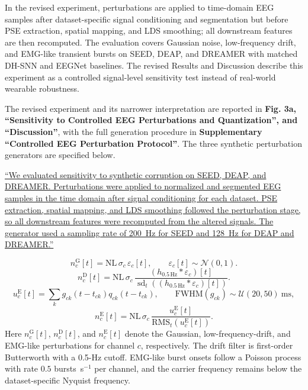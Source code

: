 \documentclass[12pt,technote,onecolumn]{IEEEtran}
\begin{document}
In the revised experiment, perturbations are applied to time-domain EEG
samples after dataset-specific signal conditioning and segmentation but
before PSE extraction, spatial mapping, and LDS smoothing; all
downstream features are then recomputed. The evaluation covers Gaussian
noise, low-frequency drift, and EMG-like transient bursts on SEED, DEAP,
and DREAMER with matched DH-SNN and EEGNet baselines. The revised
Results and Discussion describe this experiment as a controlled
signal-level sensitivity test instead of real-world wearable robustness.



The revised experiment and its narrower interpretation are reported in \textbf{Fig. 3a, ``Sensitivity to Controlled EEG Perturbations and Quantization'', and ``Discussion''}, with the full generation procedure in \textbf{Supplementary ``Controlled EEG Perturbation Protocol''}. The three synthetic perturbation generators are specified below.

\uline{``We evaluated sensitivity to synthetic corruption on SEED, DEAP, and DREAMER. Perturbations were applied to normalized and segmented EEG samples in the time domain after signal conditioning for each dataset. PSE extraction, spatial mapping, and LDS smoothing followed the perturbation stage, so all downstream features were recomputed from the altered signals. The generator used a sampling rate of 200~Hz for SEED and 128~Hz for DEAP and DREAMER.''}

\begin{equation}
n^{\mathrm{G}}_c[t]=\mathrm{NL}\,\sigma_c\,\varepsilon_c[t],
\qquad \varepsilon_c[t]\sim\mathcal{N}(0,1).
\end{equation}
\begin{equation}
n^{\mathrm{D}}_c[t]=\mathrm{NL}\,\sigma_c\,
\frac{(h_{0.5\,\mathrm{Hz}}\ast\varepsilon_c)[t]}
{\operatorname{sd}_t\!\left((h_{0.5\,\mathrm{Hz}}\ast\varepsilon_c)[t]\right)}.
\end{equation}
\begin{equation}
u^{\mathrm{E}}_c[t]=\sum_k g_{ck}(t-t_{ck})q_{ck}(t-t_{ck}),
\qquad
\mathrm{FWHM}(g_{ck})\sim\mathcal{U}(20,50)~\mathrm{ms},
\end{equation}
\begin{equation}
n^{\mathrm{E}}_c[t]=\mathrm{NL}\,\sigma_c\,
\frac{u^{\mathrm{E}}_c[t]}{\mathrm{RMS}_t\!\left(u^{\mathrm{E}}_c[t]\right)}.
\end{equation}
\noindent Here $n^{\mathrm{G}}_c[t]$, $n^{\mathrm{D}}_c[t]$, and $n^{\mathrm{E}}_c[t]$ denote the Gaussian, low-frequency-drift, and EMG-like perturbations for channel $c$, respectively. The drift filter is first-order Butterworth with a 0.5-Hz cutoff. EMG-like burst onsets follow a Poisson process with rate $0.5$ bursts~s$^{-1}$ per channel, and the carrier frequency remains below the dataset-specific Nyquist frequency.
\end{document}
